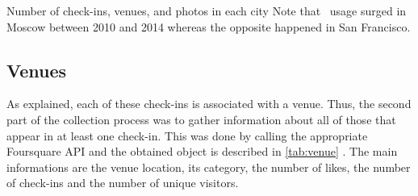 \begin{table}[ht]
\caption[Dataset number]{Number of check-ins, venues, and photos in each city
Note that \fs\ usage surged in Moscow between 2010 and 2014 whereas the
opposite happened in San Francisco.\label{tab:dataset}}
\end{table}

\subsection{Venues}

As explained, each of these check-ins is associated with a venue. Thus, the second part of
the collection process was to gather information about all of those
 that appear in at least one check-in. This was done by calling the
appropriate Foursquare API and the obtained object is described in
\autoref{tab:venue} . The main informations are the venue location, its category,
the number of likes, the number of check-ins and the number of unique visitors.

